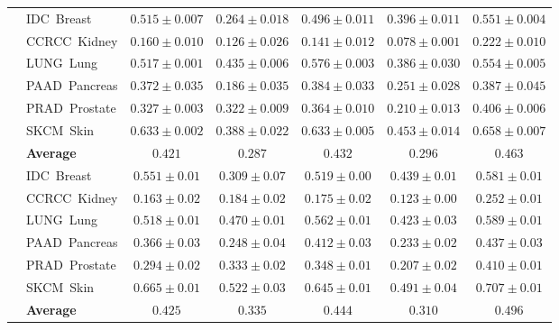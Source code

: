 \documentclass[11pt]{article}
\newcommand{\best}[1]{{\bfseries\boldmath #1}}
\begin{document}
\begin{table}[H]
{\begin{tabular}{ll ccccc}
\midrule
{} & IDC~\tiny{Breast} & $0.515{\pm}0.007$ & $0.264{\pm}0.018$ & $0.496{\pm}0.011$ & $0.396{\pm}0.011$ & \best{$0.551{\pm}0.004$} \\
 & CCRCC~\tiny{Kidney} & $0.160{\pm}0.010$ & $0.126{\pm}0.026$ & $0.141{\pm}0.012$ & $0.078{\pm}0.001$ & \best{$0.222{\pm}0.010$} \\
 & LUNG~\tiny{Lung} & $0.517{\pm}0.001$ & $0.435{\pm}0.006$ & \best{$0.576{\pm}0.003$} & $0.386{\pm}0.030$ & $0.554{\pm}0.005$ \\
 & PAAD~\tiny{Pancreas} & $0.372{\pm}0.035$ & $0.186{\pm}0.035$ & $0.384{\pm}0.033$ & $0.251{\pm}0.028$ & \best{$0.387{\pm}0.045$} \\
 & PRAD~\tiny{Prostate} & $0.327{\pm}0.003$ & $0.322{\pm}0.009$ & $0.364{\pm}0.010$ & $0.210{\pm}0.013$ & \best{$0.406{\pm}0.006$} \\
 & SKCM~\tiny{Skin} & $0.633{\pm}0.002$ & $0.388{\pm}0.022$ & $0.633{\pm}0.005$ & $0.453{\pm}0.014$ & \best{$0.658{\pm}0.007$} \\
\cmidrule(lr){2-7}
 & \textbf{Average} & $0.421$ & $0.287$ & $0.432$ & $0.296$ & \best{$0.463$} \\
\midrule
{} & IDC~\tiny{Breast} & $0.551{\pm}0.01$ & $0.309{\pm}0.07$ & $0.519{\pm}0.00$ & $0.439{\pm}0.01$ & \best{$0.581{\pm}0.01$} \\
 & CCRCC~\tiny{Kidney} & $0.163{\pm}0.02$ & $0.184{\pm}0.02$ & $0.175{\pm}0.02$ & $0.123{\pm}0.00$ & \best{$0.252{\pm}0.01$} \\
 & LUNG~\tiny{Lung} & $0.518{\pm}0.01$ & $0.470{\pm}0.01$ & $0.562{\pm}0.01$ & $0.423{\pm}0.03$ & \best{$0.589{\pm}0.01$} \\
 & PAAD~\tiny{Pancreas} & $0.366{\pm}0.03$ & $0.248{\pm}0.04$ & $0.412{\pm}0.03$ & $0.233{\pm}0.02$ & \best{$0.437{\pm}0.03$} \\
 & PRAD~\tiny{Prostate} & $0.294{\pm}0.02$ & $0.333{\pm}0.02$ & $0.348{\pm}0.01$ & $0.207{\pm}0.02$ & \best{$0.410{\pm}0.01$} \\
 & SKCM~\tiny{Skin} & $0.665{\pm}0.01$ & $0.522{\pm}0.03$ & $0.645{\pm}0.01$ & $0.491{\pm}0.04$ & \best{$0.707{\pm}0.01$} \\
\cmidrule(lr){2-7}
 & \textbf{Average} & $0.425$ & $0.335$ & $0.444$ & $0.310$ & \best{$0.496$} \\
\bottomrule
\end{tabular}%
}
\end{table}
\end{document}
